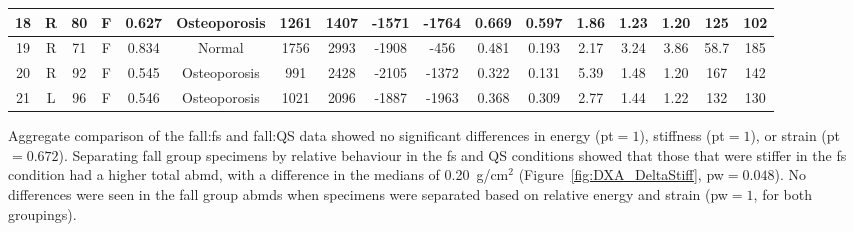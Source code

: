 {\begin{landscape}
\begin{table}
{\begin{tabular}{|c|c|c|c|c|c|c|c|c|c|c|c|c|c|c|c|c|}
\hline 18 & R & 80 & F & 0.627 & Osteoporosis &  1261 &  1407 &  -1571 &  -1764 & 0.669 & 0.597 &  1.86 &  1.23 &  1.20 & 125 & 102 \\

\hline 19 & R & 71 & F & 0.834 & Normal &  1756 &  2993 &  -1908 &   -456 & 0.481 & 0.193 &  2.17 &  3.24 &  3.86  & 58.7 & 185 \\

\hline 20 & R & 92 & F & 0.545 & Osteoporosis &   991 &  2428 &  -2105 &  -1372 & 0.322 & 0.131 &  5.39 &  1.48 &  1.20  & 167 & 142 \\

\hline 21 & L & 96 & F & 0.546 & Osteoporosis &  1021 &  2096 &  -1887 &  -1963 & 0.368 & 0.309 &  2.77 &  1.44 &  1.22  & 132 & 130 \\
\hline
\end{tabular}
}%
\end{table}
\end{landscape}
} %

Aggregate comparison of the fall:\ac{fs} and fall:\ac{QS} data showed no significant differences in energy (\ac{pt}$ = 1$), stiffness (\ac{pt}$ = 1$), or strain (\ac{pt}$ = 0.672$).
Separating fall group specimens by relative behaviour in the \ac{fs} and \ac{QS} conditions showed that those that were stiffer in the \ac{fs} condition had a higher total \ac{abmd}, with a difference in the medians of 0.20~\ac{g}/\ac{cm}$^2$ (Figure~\ref{fig:DXA_DeltaStiff}, \ac{pw}$ = 0.048$).
No differences were seen in the fall group \acp{abmd} when specimens were separated based on relative energy and strain (\ac{pw}$ = 1$, for both groupings).


